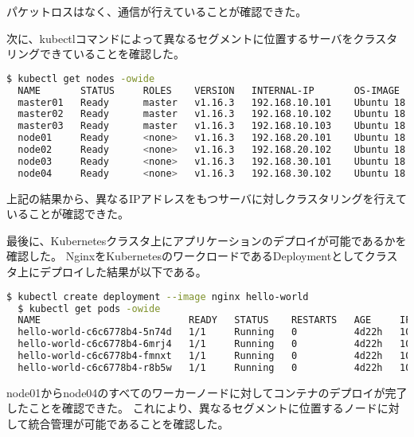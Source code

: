パケットロスはなく、通信が行えていることが確認できた。

次に、kubectlコマンドによって異なるセグメントに位置するサーバをクラスタリングできていることを確認した。

\begin{lstlisting}[language=bash]
  $ kubectl get nodes -owide
  NAME       STATUS     ROLES    VERSION   INTERNAL-IP       OS-IMAGE             KERNEL-VERSION      CONTAINER-RUNTIME
  master01   Ready      master   v1.16.3   192.168.10.101    Ubuntu 18.04.3 LTS   4.15.0-70-generic   docker://18.9.7
  master02   Ready      master   v1.16.3   192.168.10.102    Ubuntu 18.04.3 LTS   4.15.0-70-generic   docker://18.9.7
  master03   Ready      master   v1.16.3   192.168.10.103    Ubuntu 18.04.3 LTS   4.15.0-70-generic   docker://18.9.7
  node01     Ready      <none>   v1.16.3   192.168.20.101    Ubuntu 18.04.3 LTS   4.15.0-74-generic   docker://18.9.7
  node02     Ready      <none>   v1.16.3   192.168.20.102    Ubuntu 18.04.3 LTS   4.15.0-74-generic   docker://18.9.7
  node03     Ready      <none>   v1.16.3   192.168.30.101    Ubuntu 18.04.3 LTS   4.15.0-74-generic   docker://18.9.7
  node04     Ready      <none>   v1.16.3   192.168.30.102    Ubuntu 18.04.3 LTS   4.15.0-74-generic   docker://18.9.7
\end{lstlisting}

上記の結果から、異なるIPアドレスをもつサーバに対しクラスタリングを行えていることが確認できた。

最後に、Kubernetesクラスタ上にアプリケーションのデプロイが可能であるかを確認した。
NginxをKubernetesのワークロードであるDeploymentとしてクラスタ上にデプロイした結果が以下である。

\begin{lstlisting}[language=bash]
  $ kubectl create deployment --image nginx hello-world
  $ kubectl get pods -owide
  NAME                          READY   STATUS    RESTARTS   AGE     IP          NODE       NOMINATED NODE   READINESS GATES
  hello-world-c6c6778b4-5n74d   1/1     Running   0          4d22h   10.44.0.1   node01     <none>           <none>
  hello-world-c6c6778b4-6mrj4   1/1     Running   0          4d22h   10.42.0.1   node03     <none>           <none>
  hello-world-c6c6778b4-fmnxt   1/1     Running   0          4d22h   10.47.0.1   node02     <none>           <none>
  hello-world-c6c6778b4-r8b5w   1/1     Running   0          4d22h   10.44.0.2   node04   <none>           <none>
\end{lstlisting}

node01からnode04のすべてのワーカーノードに対してコンテナのデプロイが完了したことを確認できた。
これにより、異なるセグメントに位置するノードに対して統合管理が可能であることを確認した。

